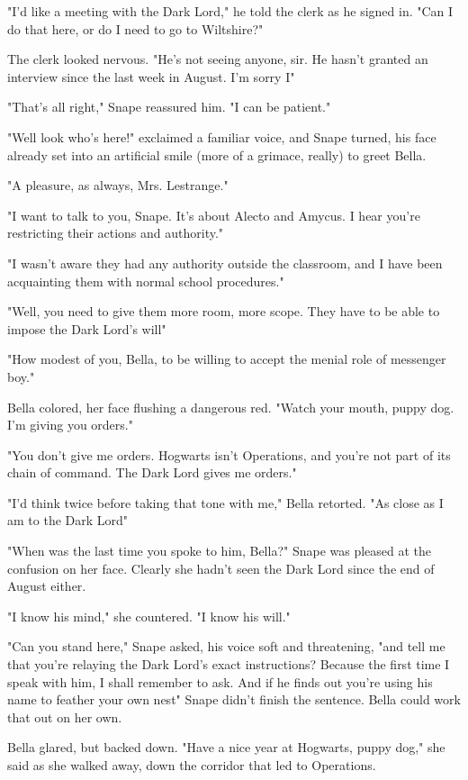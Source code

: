 "I'd like a meeting with the Dark Lord," he told the clerk as he signed in. "Can I do that here, or do I need to go to Wiltshire?"

The clerk looked nervous. "He's not seeing anyone, sir. He hasn't granted an interview since the last week in August. I'm sorry{\el} I{\el}"

"That's all right," Snape reassured him. "I can be patient."

"Well look who's here!" exclaimed a familiar voice, and Snape turned, his face already set into an artificial smile (more of a grimace, really) to greet Bella.

"A pleasure, as always, Mrs. Lestrange."

"I want to talk to you, Snape. It's about Alecto and Amycus. I hear you're restricting their actions and authority."

"I wasn't aware they had any authority outside the classroom, and I have been acquainting them with normal school procedures."

"Well, you need to give them more room, more scope. They have to be able to impose the Dark Lord's will{\el}"

"How modest of you, Bella, to be willing to accept the menial role of messenger boy."

Bella colored, her face flushing a dangerous red. "Watch your mouth, puppy dog. I'm giving you orders."

"You don't give me orders. Hogwarts isn't Operations, and you're not part of its chain of command. The Dark Lord gives me orders."

"I'd think twice before taking that tone with me," Bella retorted. "As close as I am to the Dark Lord{\el}"

"When was the last time you spoke to him, Bella?" Snape was pleased at the confusion on her face. Clearly she hadn't seen the Dark Lord since the end of August either.

"I know his mind," she countered. "I know his will."

"Can you stand here," Snape asked, his voice soft and threatening, "and tell me that you're relaying the Dark Lord's exact instructions? Because the first time I speak with him, I shall remember to ask. And if he finds out you're using his name to feather your own nest{\el}" Snape didn't finish the sentence. Bella could work that out on her own.

Bella glared, but backed down. "Have a nice year at Hogwarts, puppy dog," she said as she walked away, down the corridor that led to Operations.

